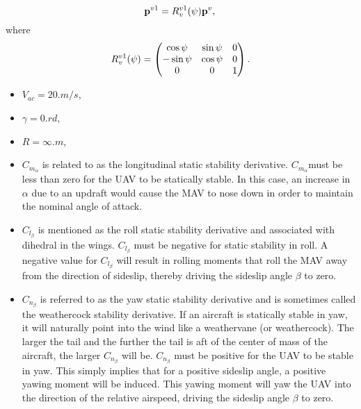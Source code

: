 \begin{equation}
  \textbf{p}^{v1}=R^{v1}_v(\psi)\textbf{p}^{v},\\
\end{equation}
  where
\begin{equation}
  R^{v1}_v(\psi)= \begin{pmatrix}
  \cos{\psi}  & \sin{\psi}   & 0  \\
  -\sin{\psi} & \cos{\psi}   & 0  \\ 
       0      &      0       & 1
    \end{pmatrix}.\\
\end{equation}


\begin{itemize}
\setlength{\itemindent}{6cm}
    \item \(V_{ac}= 20 \si{.m/s}\),
    \item \(\gamma= 0 \si{.rd}\),
    \item \(R = \infty \si{.m}\),
\end{itemize}\par



\begin{itemize}
    \item \(C_{m_\alpha}\) is related to as the longitudinal static stability derivative. \(C_{m_\alpha}\)must be less than zero for the UAV to be statically stable. In this case, an increase in \(\alpha\) due to an updraft would cause the MAV to nose down in order to maintain the nominal angle of attack.
    \item \(C_{l_\beta}\) is mentioned as the roll static stability derivative and associated with dihedral in the wings. \(C_{l_\beta}\) must be negative for static stability in roll. A negative value for \(C_{l_\beta}\) will result in rolling moments that roll the MAV away from the direction of sideslip, thereby driving the sideslip angle \(\beta\) to zero.
    \item \(C_{n_\beta}\) is referred to as the yaw static stability derivative and is sometimes called the weathercock stability derivative. If an aircraft is statically stable in yaw, it will naturally point into the wind like a weathervane (or weathercock). The larger the tail and the further the tail is aft of the center of mass of the aircraft, the larger \(C_{n_\beta}\) will be. \(C_{n_\beta}\) must be positive for the UAV to be stable in yaw. This simply implies that for a positive sideslip angle, a positive yawing moment will be induced. This yawing moment will yaw the UAV into the direction of the relative airspeed, driving the sideslip angle \(\beta\) to zero.
\end{itemize}\par
